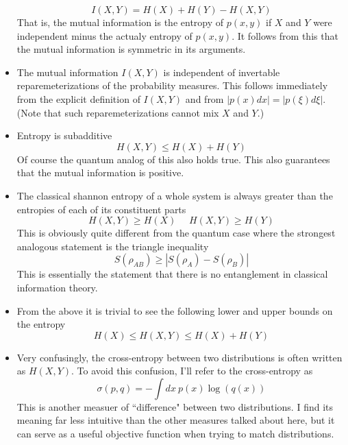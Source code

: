 \documentclass[10pt]{article}
\begin{document}
\begin{itemize}
		$$ I(X,Y) = H(X) + H(Y) - H(X,Y) $$
		That is, the mutual information is the entropy of $p(x,y)$ if $X$ and $Y$ were independent minus the actualy entropy of $p(x,y)$.  It follows from this that the mutual information is symmetric in its arguments.
    \item The mutual information $I(X,Y)$ is independent of invertable reparemeterizations of the probability measures.  This follows immediately from the
        explicit definition of $I(X,Y)$ and from $|p(x)dx| = |p(\xi)d\xi|$.  (Note that such reparemeterizations cannot mix $X$ and $Y$.)
	\item Entropy is subadditive
		$$ H(X,Y) \le H(X) + H(Y) $$
		Of course the quantum analog of this also holds true.  This also guarantees that the mutual information is positive.
	\item The classical shannon entropy of a whole system is always greater than the entropies of each of its constituent parts
		$$ H(X,Y) \ge H(X) ~~~~~~ H(X,Y) \ge H(Y) $$
		This is obviously quite different from the quantum case where the strongest analogous statement is the triangle inequality
		$$ S(\rho_{AB}) \ge |S(\rho_{A}) - S(\rho_{B})| $$
		This is essentially the statement that there is no entanglement in classical information theory.
	\item From the above it is trivial to see the following lower and upper bounds on the entropy
		$$ H(X) \le H(X,Y) \le H(X) + H(Y) $$
	\item Very confusingly, the cross-entropy between two distributions is often written as $H(X,Y)$.  To avoid this confusion, I'll refer to the cross-entropy as
		$$ \sigma(p,q) = -\int dx~ p(x)\log(q(x)) $$
		This is another measuer of ``difference" between two distributions.  I find its meaning far less intuitive than the other measures talked about here, but it can serve as a useful objective function when trying to match distributions.
\end{itemize}
\end{document}
